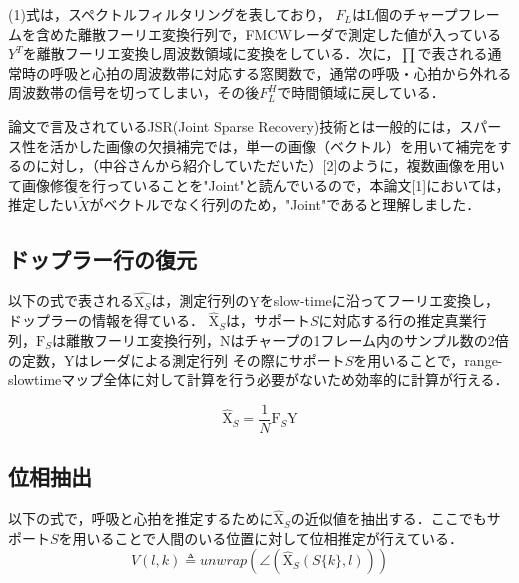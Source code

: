 \documentclass[dvipdfmx]{jsarticle}
\begin{document}
(1)式は，スペクトルフィルタリングを表しており，
$F_L$はL個のチャープフレームを含めた離散フーリエ変換行列で，FMCWレーダで測定した値が入っている$Y^T$を離散フーリエ変換し周波数領域に変換をしている．次に，$\prod$で表される通常時の呼吸と心拍の周波数帯に対応する窓関数で，通常の呼吸・心拍から外れる周波数帯の信号を切ってしまい，その後$F^H_L$で時間領域に戻している．

論文で言及されているJSR(Joint Sparse Recovery)技術とは一般的には，スパース性を活かした画像の欠損補完では，単一の画像（ベクトル）を用いて補完をするのに対し，（中谷さんから紹介していただいた）[2]のように，複数画像を用いて画像修復を行っていることを"Joint"と読んでいるので，本論文[1]においては，推定したい$\tilde{X}$がベクトルでなく行列のため，"Joint"であると理解しました．

\subsection{ドップラー行の復元}
以下の式で表される$\hat{\mathrm{X}_{\textit{S}}}$は，測定行列の$\mathrm{Y}$をslow-timeに沿ってフーリエ変換し，ドップラーの情報を得ている．
$\hat{\mathrm{X}}_{S}$は，サポート$S$に対応する行の推定真業行列，$\mathrm{F}_{S}$は離散フーリエ変換行列，Nはチャープの1フレーム内のサンプル数の2倍の定数，Yはレーダによる測定行列
その際にサポート$S$を用いることで，range-slowtimeマップ全体に対して計算を行う必要がないため効率的に計算が行える．

\begin{equation}\label{}
\mathrm{\hat{X}}_{S} = \frac{1}{N} \mathrm{F}_{S} \mathrm{Y}
\end{equation}

\subsection{位相抽出}
以下の式で，呼吸と心拍を推定するために$\hat{\mathrm{X}}_S$の近似値を抽出する．ここでもサポート$S$を用いることで人間のいる位置に対して位相推定が行えている．
\begin{equation}\label{}
V (l, k) \triangleq unwrap(\angle(\hat{\mathrm{X}}_{S}(S\{k\}, l)))
\end{equation}
\end{document}
